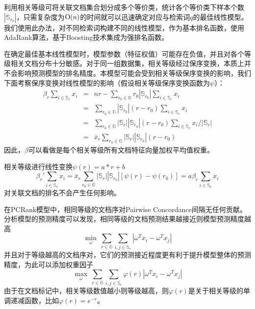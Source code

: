 利用相关等级可将关联文档集合划分成多个等价类，统计各个等价类下样本个数$|\mathbb{S}_{r_0}|$，只需复杂度为$\operatorname{\mathrm{O}}(n)$的时间就可以迅速确定对应与检索词$q$的最佳线性模型。我们使用此办法，对不同检索词构建不同的线性模型，作为基本排名函数，使用AdaRank算法，基于Boosting技术集成为强排名函数。

在确定最佳基本线性模型时，模型参数（特征权值）可能存在负值，并且对各个等级相关文档分布十分敏感。对于同一组数据集，相关等级经过保序变换，本质上并不会影响预测模型的排名精度。本模型可能会受到相关等级保序变换的影响，我们下面考察保序变换对线性模型的影响（假设相关等级保序变换函数为$\psi$）：
\begin{equation}
    \begin{array}{lll}
      \beta_r \sum\limits_{i\in \mathbb{S}_r} x_i & = & nr - \sum\limits_{r_0\in \mathbb{G}} r_0|\mathbb{S}_{r_0}| \sum\limits_{i\in \mathbb{S}_r} x_i\\
      & = & \sum\limits_{r_0\in \mathbb{G}} |\mathbb{S}_{r_0}| (r-r_0) \sum\limits_{i\in \mathbb{S}_r} x_i\\
      & = & \sum\limits_{r_0\in \mathbb{G}} |\mathbb{S}_r| |\mathbb{S}_{r_0}| (r-r_0) \sum\limits_{i\in \mathbb{S}_r} x_i/ |\mathbb{S}_r|\\
      & = & \bar{x}_r \sum\limits_{r_0\in \mathbb{G}} |\mathbb{S}_r| |\mathbb{S}_{r_0}| (r-r_0)
    \end{array}
\end{equation}
因此，$\beta$可以看做是每个相关等级所有文档特征向量加权平均值权重。

相关等级进行线性变换$\psi(r) = a*r+b$
\begin{equation}
    \beta_r' \sum\limits_{i\in \mathbb{S}_r} x_i = \bar{x}_r \sum\limits_{r_0\in \mathbb{G}} |\mathbb{S}_r| |\mathbb{S}_{r_0}| [\psi(r) - \psi(r_0)] = a \beta_r \sum\limits_{i\in \mathbb{S}_r} x_i
\end{equation}
对关联文档的排名不会产生任何影响。

在PCRank模型中，相同等级的文档序对Pairwise Concordance间隔无任何贡献。分析模型的预测精度可以发现，相同等级的文档预测结果越接近则模型预测精度越高
\begin{equation}
    \min\limits_{\omega} ~\sum\limits_{r\in \mathbb{G}} \sum\limits_{i,j\in \mathbb{S}_r} |\omega^T x_i - \omega^T x_j|
\end{equation}
并且对于等级越高的文档序对，它们的预测接近程度更有利于提升模型整体的预测精度，为此可以添加权重因子
\begin{equation}
    \max\limits_{\omega} ~\sum\limits_{r\in \mathbb{G}} \sum\limits_{i,j\in \mathbb{S}_r} \varphi(r) |\omega^T x_i - \omega^T x_j|
\end{equation}
由于在文档标记中，相关等级数值越小则等级越高，则$\varphi(r)$是关于相关等级的单调递减函数，比如$\varphi(r)=e^{-r}$。

